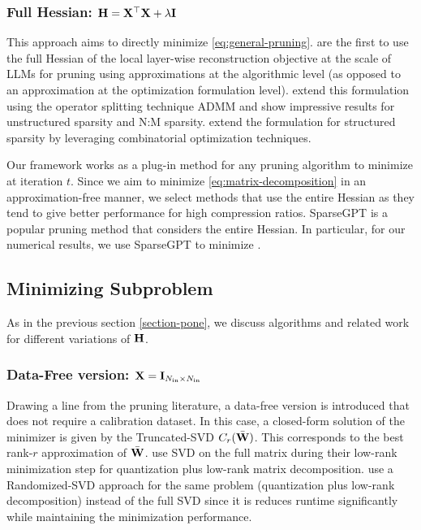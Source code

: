 \subsubsection{Full Hessian: $\mathbf{H} = \mathbf{X}^\top\mathbf{X} + \lambda \mathbf{I}$}\label{full-hessian-pruning}
\vspace{-3pt}
This approach aims to directly minimize \eqref{eq:general-pruning}. \citet{frantar2023sparsegpt} are the first to use the full Hessian of the local layer-wise reconstruction objective \Pone at the scale of LLMs for pruning using approximations at the algorithmic level (as opposed to an approximation at the optimization formulation level). \citet{meng2024alps} extend this formulation using the operator splitting technique ADMM \cite{boyd2011distributed} and show impressive results for unstructured sparsity and N:M sparsity. \citet{meng2024osscar} extend the formulation for structured sparsity by leveraging combinatorial optimization techniques.

Our framework works as a plug-in method for any pruning algorithm to minimize \Pone at iteration $t$. Since we aim to minimize \cref{eq:matrix-decomposition} in an approximation-free manner, we select methods that use the entire Hessian as they tend to give better performance for high compression ratios. SparseGPT \cite{frantar2023sparsegpt} is a popular pruning method that considers the entire Hessian. In particular, for our numerical results, we use SparseGPT to minimize \Pone.
\vspace{-3pt}
\subsection{Minimizing Subproblem \Ptwo}
\vspace{-3pt}
As in the previous section \ref{section-pone}, we discuss algorithms and related work for different variations of $\mathbf{H}$.
\vspace{-3pt}
\subsubsection{Data-Free version: $\mathbf{X} = \mathbf{I}_{N_{\text{in}} \times N_{\text{in}}}$} 
\vspace{-3pt}
Drawing a line from the pruning literature, a data-free version is introduced that does not require a calibration dataset. In this case, a closed-form solution of the minimizer is given by the Truncated-SVD $C_r(\Bar{\mathbf{W}})$. This corresponds to the best rank-$r$ approximation of $\Bar{\mathbf{W}}$. \citet{li2023loftq} use SVD on the full matrix during their low-rank minimization step for quantization plus low-rank matrix decomposition. \citet{guo2023lq} use a Randomized-SVD \cite{halko2011finding} approach for the same problem (quantization plus low-rank decomposition) instead of the full SVD since it is reduces runtime significantly while maintaining the minimization performance.
\vspace{-3pt}

